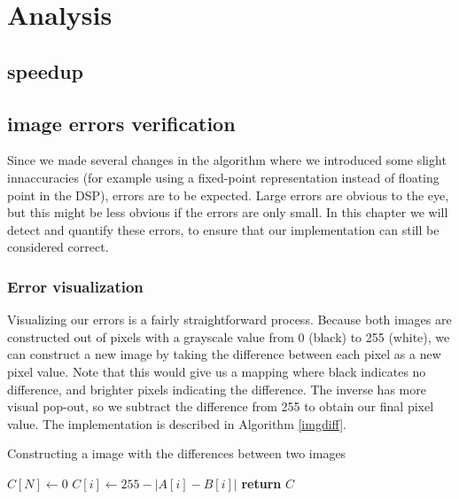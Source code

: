 \section{Analysis}
\subsection{speedup}
\subsection{image errors verification}
Since we made several changes in the algorithm where we introduced some slight innaccuracies (for example using a fixed-point representation instead of floating point in the DSP), errors are to be expected. Large errors are obvious to the eye, but this might be less obvious if the errors are only small. In this chapter we will detect and quantify these errors, to ensure that our implementation can still be considered correct.

\subsubsection{Error visualization}
Visualizing our errors is a fairly straightforward process. Because both images are constructed out of pixels with a grayscale value from 0 (black) to 255 (white), we can construct a new image by taking the difference between each pixel as a new pixel value. Note that this would give us a mapping where black indicates no difference, and brighter pixels indicating the difference. The inverse has more visual pop-out, so we subtract the difference from 255 to obtain our final pixel value. The implementation is described in Algorithm \ref{imgdiff}.

\begin{algorithm}[t]
    \caption{Constructing a image with the differences between two images}\label{imgdiff}
    \begin{algorithmic}[1]
          
        \State $C[N]\gets 0$
           \State $C[i]\gets 255 - |A[i] - B[i]|$   
        \EndFor
        \State \textbf{return} $C$
        \EndProcedure
    \end{algorithmic}
\end{algorithm}
